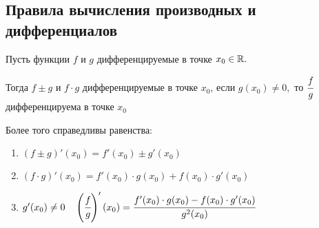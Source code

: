 \subsection{Правила вычисления производных и дифференциалов}
\begin{theorem} \hypertarget{thrm5.3}{}
    Пусть функции $f$ и $g$ дифференцируемые в точке $x_{0}\in \mathbb{R}.$

    Тогда $f \pm g$ и $ f\cdot g$ дифференцируемые в точке $x_{0}$, если $g(x_{0}) \neq 0,$ то $\cfrac{f}{g}$ дифференцируема в точке $x_{0}$

    Более того справедливы равенства: 
    \begin{enumerate}
        \item $  (f \pm g)'(x_{0}) = f'(x_{0}) \pm g'({x_{0}}) $
        \item  $ (f \cdot g)'(x_{0}) = f'(x_{0}) \cdot g({x_{0}}) + f(x_{0}) \cdot g'({x_{0}})$
        \item $g'(x_{0}) \neq 0 \quad \left(\cfrac{f}{g}\right)' (x_{0}) = \cfrac{f'(x_{0}) \cdot g({x_{0}}) - f(x_{0}) \cdot g'({x_{0}})}{g^{2}(x_{0})}$
    \end{enumerate}
\end{theorem}
